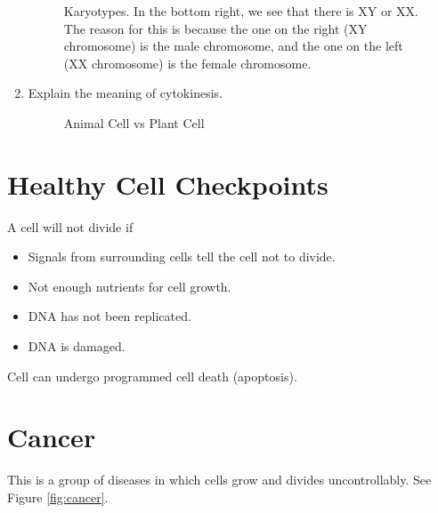 \documentclass[12pt]{report}
\begin{document}
\begin{enumerate}
\begin{solution}
\begin{figure}[H]
                    \caption{Karyotypes. In the bottom right, we see that there is XY or XX. The reason for this is because the one on the right (XY chromosome) is the male chromosome, and the one on the left (XX chromosome) is the female chromosome.}
                \end{figure}
            \end{solution}

            \item{Explain the meaning of cytokinesis.}
\begin{figure}[ht]
    \centering
    \caption{Animal Cell vs Plant Cell}
    \label{fig:animal-cell}
\end{figure}
\end{enumerate}

\section{Healthy Cell Checkpoints}
\begin{definition}
    A cell will not divide if 
    \begin{itemize}
        \item{Signals from surrounding cells tell the cell not to divide.}
        \item{Not enough nutrients for cell growth.}
        \item{DNA has not been replicated.}
        \item{DNA is damaged.}
    \end{itemize}
    Cell can undergo programmed cell death (apoptosis).
\end{definition}

\section{Cancer}
\begin{definition}[Cancer]
    This is a group of diseases in which cells grow and divides uncontrollably. See Figure \ref{fig:cancer}.
\end{definition}
\end{document}
